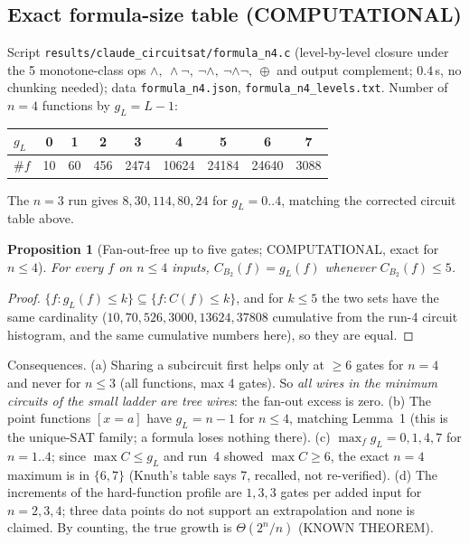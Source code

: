 \documentclass[11pt]{article}
\newtheorem{prop}{Proposition}
\begin{document}
\subsection{Exact formula-size table (COMPUTATIONAL)}
Script \texttt{results/claude\_circuitsat/formula\_n4.c} (level-by-level closure under the 5 monotone-class ops $\wedge,\ \wedge\neg,\ \neg\wedge,\ \neg\wedge\neg,\ \oplus$ and output complement; $0.4$\,s, no chunking needed);
data \texttt{formula\_n4.json}, \texttt{formula\_n4\_levels.txt}. Number of $n=4$ functions by $g_L=L-1$:
\begin{center}\begin{tabular}{@{}lcccccccc@{}}\toprule
$g_L$ & 0 & 1 & 2 & 3 & 4 & 5 & 6 & 7\\\midrule
$\#f$ & 10 & 60 & 456 & 2474 & 10624 & 24184 & 24640 & 3088\\\bottomrule\end{tabular}\end{center}
The $n=3$ run gives $8,30,114,80,24$ for $g_L=0..4$, matching the corrected circuit table above.
\begin{prop}[Fan-out-free up to five gates; COMPUTATIONAL, exact for $n\le4$]
For every $f$ on $n\le 4$ inputs, $C_{B_2}(f)=g_L(f)$ whenever $C_{B_2}(f)\le5$.
\end{prop}
\begin{proof}
$\{f:g_L(f)\le k\}\subseteq\{f:C(f)\le k\}$, and for $k\le5$ the two sets have the same cardinality
($10,70,526,3000,13624,37808$ cumulative from the run-4 circuit histogram, and the same cumulative numbers here), so they are equal.
\end{proof}
Consequences. (a) Sharing a subcircuit first helps only at $\ge6$ gates for $n=4$ and never for $n\le3$ (all functions, max 4 gates). So \emph{all wires in the minimum circuits of the small ladder are tree wires}: the fan-out excess is zero.
(b) The point functions $[x=a]$ have $g_L=n-1$ for $n\le4$, matching Lemma~1 (this is the unique-SAT family; a formula loses nothing there).
(c) $\max_f g_L=0,1,4,7$ for $n=1..4$; since $\max C\le g_L$ and run~4 showed $\max C\ge 6$, the exact $n=4$ maximum is in $\{6,7\}$ (Knuth's table says 7, recalled, not re-verified).
(d) The increments of the hard-function profile are $1,3,3$ gates per added input for $n=2,3,4$; three data points do not support an extrapolation and none is claimed. By counting, the true growth is $\Theta(2^n/n)$ (KNOWN THEOREM).
\end{document}
